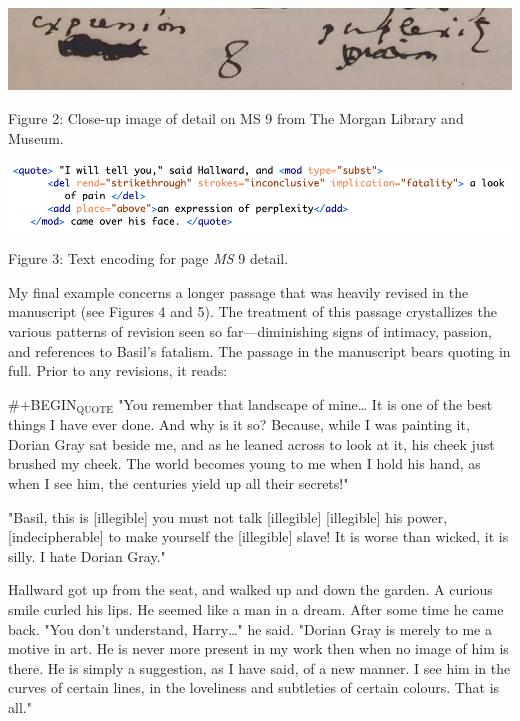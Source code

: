 \documentclass[11pt]{article}
\begin{document}
\begin{center}
\includegraphics[width=.9\linewidth]{./figure2.png}
\end{center}
Figure 2: Close-up image of detail on MS 9 from The Morgan Library and
Museum. 

\begin{center}
\includegraphics[width=.9\linewidth]{./figure3.png}
\end{center}
Figure 3: Text encoding for page \emph{MS} 9 detail.

My final example concerns a longer passage that was heavily revised in
the manuscript (see Figures 4 and 5). The treatment of this passage
crystallizes the various patterns of revision seen so
far---diminishing signs of intimacy, passion, and references to
Basil's fatalism. The passage in the manuscript bears quoting in
full. Prior to any revisions, it reads:

\#+BEGIN\(_{\text{QUOTE}}\) "You remember that landscape of mine\ldots{} It is one of the
best things I have ever done. And why is it so? Because, while I was
painting it, Dorian Gray sat beside me, and as he leaned across to
look at it, his cheek just brushed my cheek. The world becomes young
to me when I hold his hand, as when I see him, the centuries yield up
all their secrets!"

"Basil, this is [illegible] you must not talk [illegible] [illegible]
his power, [indecipherable] to make yourself the [illegible] slave! It
is worse than wicked, it is silly. I hate Dorian Gray."

Hallward got up from the seat, and walked up and down the garden. A
curious smile curled his lips. He seemed like a man in a dream. After
some time he came back. "You don't understand, Harry\ldots{}" he said.
"Dorian Gray is merely to me a motive in art. He is never more present
in my work then when no image of him is there. He is simply a
suggestion, as I have said, of a new manner. I see him in the curves
of certain lines, in the loveliness and subtleties of certain
colours. That is all."
\end{document}
